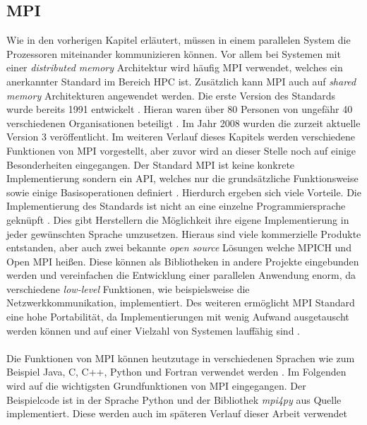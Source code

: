 \subsection{MPI}
\label{subsec:mpi}
Wie in den vorherigen Kapitel erläutert, müssen in einem parallelen System die Prozessoren miteinander kommunizieren können. Vor allem bei Systemen mit einer \emph{distributed memory} Architektur wird häufig \ac{MPI} verwendet, welches ein anerkannter Standard im Bereich \ac{HPC} ist. Zusätzlich kann \ac{MPI} auch auf \emph{shared memory} Architekturen angewendet werden. Die erste Version des Standards wurde bereits 1991 entwickelt \cite{nielsen2016introduction}. Hieran waren über 80 Personen von ungefähr 40 verschiedenen Organisationen beteiligt \cite{dongarra1995introduction}. Im Jahr 2008 wurden die zurzeit aktuelle Version 3 veröffentlicht. Im weiteren Verlauf dieses Kapitels werden verschiedene Funktionen von \ac{MPI} vorgestellt, aber zuvor wird an dieser Stelle noch auf einige Besonderheiten eingegangen. Der Standard \ac{MPI} ist keine konkrete Implementierung sondern ein \ac{API}, welches nur die grundsätzliche Funktionsweise sowie einige Basisoperationen definiert \cite{nielsen2016introduction}. Hierdurch ergeben sich viele Vorteile. Die Implementierung des Standards ist nicht an eine einzelne Programmiersprache geknüpft \cite{nielsen2016introduction}. Dies gibt Herstellern die Möglichkeit ihre eigene Implementierung in jeder gewünschten Sprache umzusetzen. Hieraus sind viele kommerzielle Produkte entstanden, aber auch zwei bekannte \emph{open source} Lösungen welche MPICH und Open MPI heißen. Diese können als Bibliotheken in andere Projekte eingebunden werden und vereinfachen die Entwicklung einer parallelen Anwendung enorm, da verschiedene \emph{low-level} Funktionen, wie beispielsweise die Netzwerkkommunikation, implementiert. Des weiteren ermöglicht \ac{MPI} Standard eine hohe Portabilität, da Implementierungen mit wenig Aufwand ausgetauscht werden können und auf einer Vielzahl von Systemen lauffähig sind \cite{dalcin2008mpi}.
\\\\
Die Funktionen von \ac{MPI} können heutzutage in verschiedenen Sprachen wie zum Beispiel Java, C, C++, Python und Fortran verwendet werden \cite{nielsen2016introduction}. Im Folgenden wird auf die wichtigsten Grundfunktionen von \ac{MPI} eingegangen. Der Beispielcode ist in der Sprache Python und der Bibliothek \emph{mpi4py} aus Quelle \cite{dalcin2008mpi} implementiert. Diese werden auch im späteren Verlauf dieser Arbeit verwendet
